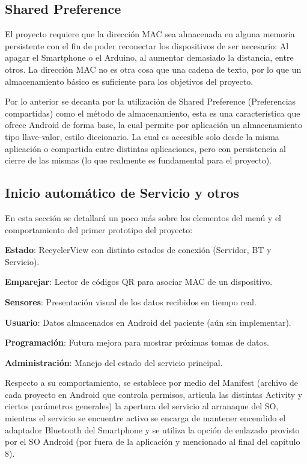 \subsection{Shared Preference}

El proyecto requiere que la dirección MAC sea almacenada en alguna memoria persistente con el fin de poder reconectar los dispositivos de ser necesario: Al apagar el Smartphone o el Arduino, al aumentar demasiado la distancia, entre otros. La dirección MAC no es otra cosa que una cadena de texto, por lo que un almacenamiento básico es suficiente para los objetivos del proyecto.

Por lo anterior se decanta por la utilización de Shared Preference (Preferencias compartidas) como el método de almacenamiento, esta es una característica que ofrece Android de forma base, la cual permite por aplicación un almacenamiento tipo llave-valor, estilo diccionario. La cual es accesible solo desde la misma aplicación o compartida entre distintas aplicaciones, pero con persistencia al cierre de las mismas (lo que realmente es fundamental para el proyecto).

\subsection{Inicio automático de Servicio y otros}

En esta sección se detallará un poco más sobre los elementos del menú y el  comportamiento del primer prototipo del proyecto:

\textbf{Estado}: RecyclerView con distinto estados de conexión (Servidor, BT y Servicio).

\textbf{Emparejar}: Lector de códigos QR para asociar MAC de un dispositivo.

\textbf{Sensores}: Presentación visual de los datos recibidos en tiempo real.

\textbf{Usuario}: Datos almacenados en Android del paciente (aún sin implementar).

\textbf{Programación}: Futura mejora para mostrar próximas tomas de datos.

\textbf{Administración}: Manejo del estado del servicio principal.

Respecto a su comportamiento, se establece por medio del Manifest (archivo de cada proyecto en Android que controla permisos, articula las distintas Activity y ciertos parámetros generales) la apertura del servicio al arranaque del SO, mientras el servicio se encuentre activo se encarga de mantener encendido el adaptador Bluetooth del Smartphone y se utiliza la opción de enlazado provisto por el SO Android (por fuera de la aplicación y mencionado al final del capítulo 8).
 

